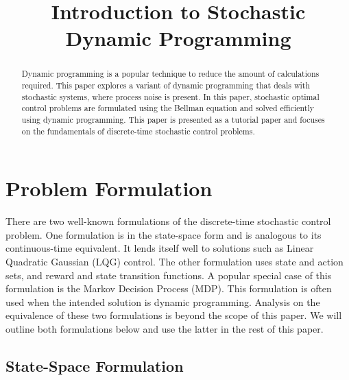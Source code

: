 \documentclass[conference]{IEEEtran}
\begin{document}
\title{Introduction to Stochastic Dynamic Programming}

\author{
}

\maketitle

\begin{abstract}
Dynamic programming is a popular technique to reduce the amount of calculations required. This paper explores a variant of dynamic programming that deals with stochastic systems, where process noise is present. In this paper, stochastic optimal control problems are formulated using the Bellman equation and solved efficiently using dynamic programming. This paper is presented as a tutorial paper and focuses on the fundamentals of discrete-time stochastic control problems.
\end{abstract}

%

\section{Problem Formulation}

There are two well-known formulations of the discrete-time stochastic control problem. One formulation is in the state-space form and is analogous to its continuous-time equivalent. It lends itself well to solutions such as Linear Quadratic Gaussian (LQG) control. The other formulation uses state and action sets, and reward and state transition functions. A popular special case of this formulation is the Markov Decision Process (MDP). This formulation is often used when the intended solution is dynamic programming. Analysis on the equivalence of these two formulations is beyond the scope of this paper. We will outline both formulations below and use the latter in the rest of this paper.

\subsection{State-Space Formulation}
\end{document}
